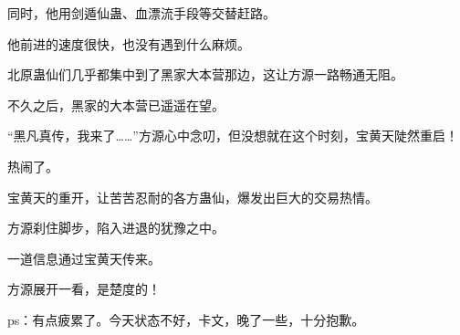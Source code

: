 \begin{this_body}
同时，他用剑遁仙蛊、血漂流手段等交替赶路。

他前进的速度很快，也没有遇到什么麻烦。

北原蛊仙们几乎都集中到了黑家大本营那边，这让方源一路畅通无阻。

不久之后，黑家的大本营已遥遥在望。

“黑凡真传，我来了……”方源心中念叨，但没想就在这个时刻，宝黄天陡然重启！

热闹了。

宝黄天的重开，让苦苦忍耐的各方蛊仙，爆发出巨大的交易热情。

方源刹住脚步，陷入进退的犹豫之中。

一道信息通过宝黄天传来。

方源展开一看，是楚度的！

ps：有点疲累了。今天状态不好，卡文，晚了一些，十分抱歉。

\end{this_body}

